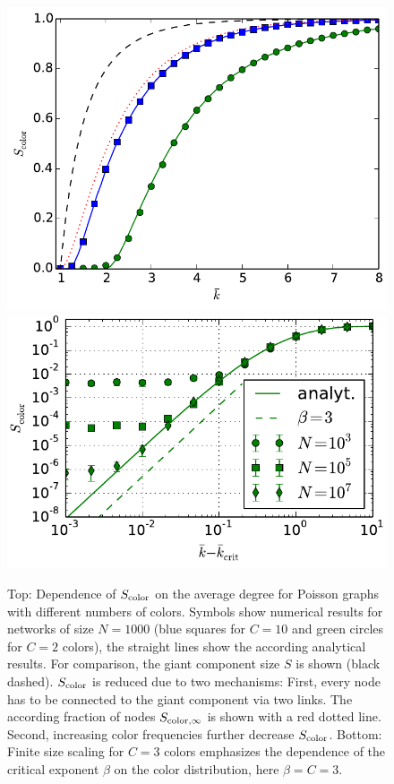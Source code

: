 \documentclass[aps, pre, twocolumn, a4paper, floatfix]{revtex4}
\begin{document}
\begin{figure}[htb]
\begin{center}
    \includegraphics[width=1.0\columnwidth]{S_color_poisson.pdf}
    \includegraphics[width=1.0\columnwidth]{testtest.pdf}
    \caption{Top: Dependence of $S_{\rm color}$ on the average degree for Poisson graphs with different 
    numbers of colors. Symbols show numerical results for networks of size $N=1000$ 
    (blue squares for $C=10$ and green circles for $C=2$ colors), 
    the straight lines show the according analytical results. For comparison, 
    the giant component size $S$ is shown (black dashed). $S_{\rm color}$ is reduced due to two mechanisms: First, 
    every node has to be connected to the giant component via two links. The according fraction of 
    nodes $S_{{\rm color},\infty}$ is shown with a red dotted line. Second, increasing color frequencies 
    further decrease $S_{\rm color}$. Bottom: Finite size scaling for $C=3$ colors emphasizes the dependence 
    of the critical exponent $\beta$ on the color distribution, here $\beta=C=3$.}
    \label{fig:poisson}
\end{center}
\end{figure}
\end{document}
